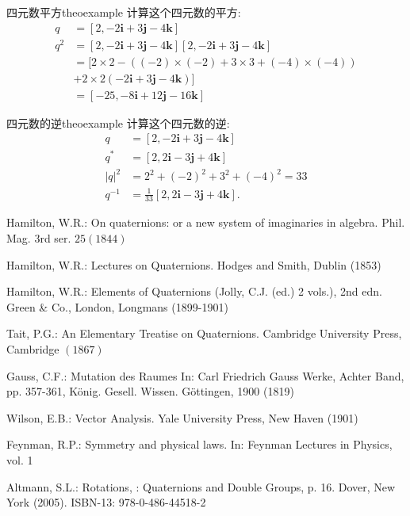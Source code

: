 \begin{myexample}{四元数平方}{theoexample}
计算这个四元数的平方:
$$
    \begin{aligned}
        q     & =[2,-2 \mathbf{i}+3 \mathbf{j}-4 \mathbf{k}]                                            \\
        q^{2} & =[2,-2 \mathbf{i}+3 \mathbf{j}-4 \mathbf{k}][2,-2 \mathbf{i}+3 \mathbf{j}-4 \mathbf{k}] \\
              & =[2 \times 2-((-2) \times(-2)+3 \times 3+(-4) \times(-4))                               \\
              & +2 \times 2(-2 \mathbf{i}+3 \mathbf{j}-4 \mathbf{k})]                                   \\
              & =[-25,-8 \mathbf{i}+12 \mathbf{j}-16 \mathbf{k}]
    \end{aligned}
$$
\end{myexample}

\begin{myexample}{四元数的逆}{theoexample}
计算这个四元数的逆:
$$
    \begin{aligned}
        q       & =[2,-2 \mathbf{i}+3 \mathbf{j}-4 \mathbf{k}]              \\
        q^{*}   & =[2,2 \mathbf{i}-3 \mathbf{j}+4 \mathbf{k}]               \\
        |q|^{2} & =2^{2}+(-2)^{2}+3^{2}+(-4)^{2}=33                         \\
        q^{-1}  & =\frac{1}{33}[2,2 \mathbf{i}-3 \mathbf{j}+4 \mathbf{k}] .
    \end{aligned}
$$
\end{myexample}



\begin{thebibliography}{99}
     Hamilton, W.R.: On quaternions: or a new system of imaginaries in algebra. Phil. Mag. 3rd ser. $25(1844)$

     Hamilton, W.R.: Lectures on Quaternions. Hodges and Smith, Dublin (1853)

     Hamilton, W.R.: Elements of Quaternions (Jolly, C.J. (ed.) 2 vols.), 2nd edn. Green \& Co., London, Longmans (1899-1901)

     Tait, P.G.: An Elementary Treatise on Quaternions. Cambridge University Press, Cambridge $(1867)$

     Gauss, C.F.: Mutation des Raumes In: Carl Friedrich Gauss Werke, Achter Band, pp. 357-361, König. Gesell. Wissen. Göttingen, 1900 (1819)

     Wilson, E.B.: Vector Analysis. Yale University Press, New Haven (1901)

     Feynman, R.P.: Symmetry and physical laws. In: Feynman Lectures in Physics, vol. 1

     Altmann, S.L.: Rotations, : Quaternions and Double Groups, p. 16. Dover, New York (2005). ISBN-13: 978-0-486-44518-2

\end{thebibliography}
